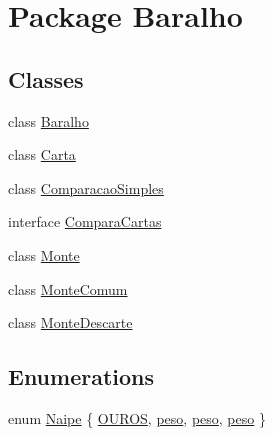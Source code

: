 \hypertarget{namespace_baralho}{
\section{Package Baralho}
\label{namespace_baralho}
}
\subsection*{Classes}
\begin{DoxyCompactItemize}
\item 
class \hyperlink{class_baralho_1_1_baralho}{Baralho}
\item 
class \hyperlink{class_baralho_1_1_carta}{Carta}
\item 
class \hyperlink{class_baralho_1_1_comparacao_simples}{ComparacaoSimples}
\item 
interface \hyperlink{interface_baralho_1_1_compara_cartas}{ComparaCartas}
\item 
class \hyperlink{class_baralho_1_1_monte}{Monte}
\item 
class \hyperlink{class_baralho_1_1_monte_comum}{MonteComum}
\item 
class \hyperlink{class_baralho_1_1_monte_descarte}{MonteDescarte}
\end{DoxyCompactItemize}
\subsection*{Enumerations}
\begin{DoxyCompactItemize}
\item 
enum \hyperlink{namespace_baralho_ab887857dcb81ef6672322ce80039b905}{Naipe} \{ \hyperlink{namespace_baralho_ab887857dcb81ef6672322ce80039b905}{OUROS}, 
\hyperlink{namespace_baralho_ab887857dcb81ef6672322ce80039b905}{peso}, 
\hyperlink{namespace_baralho_ab887857dcb81ef6672322ce80039b905}{peso}, 
\hyperlink{namespace_baralho_ab887857dcb81ef6672322ce80039b905}{peso}
 \}
\end{DoxyCompactItemize}


